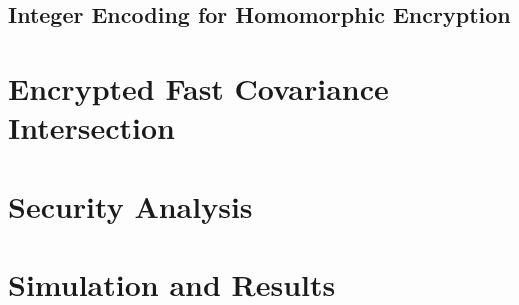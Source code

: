 \documentclass[letterpaper, 10 pt, conference]{ieeeconf}
\begin{document}
\subsection{Integer Encoding for Homomorphic Encryption}\label{subsec:encoding}


% 
%                                                                        
%                                                                        
%                                                                        
% 
\section{Encrypted Fast Covariance Intersection}\label{sec:encrypted_fci}


% 
%                                 
%                                 
%                                 
% 
\section{Security Analysis}\label{sec:security}


% 
%                                 
%                                 
%                                 
% 
\section{Simulation and Results}\label{sec:simulation}
\end{document}
